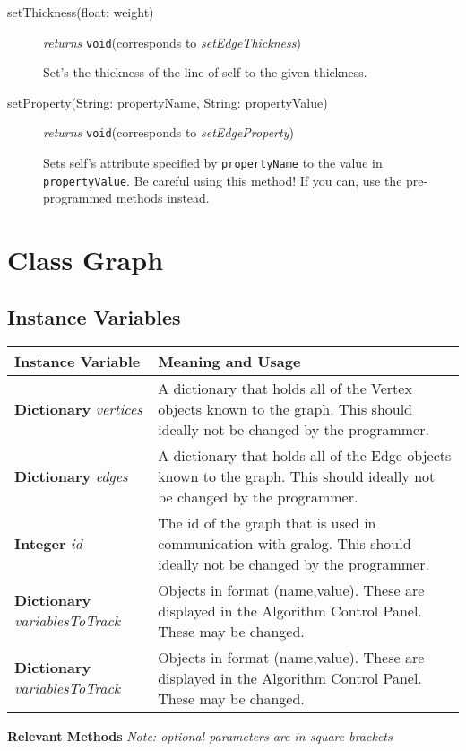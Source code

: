 \documentclass{article}
\newlength\q
\begin{document}
\begin{description}
\label{setEdgeThiccnessClass}\item[setThickness({float: weight})]\emph{returns} \texttt{void}\quad(corresponds to \textit{setEdgeThickness})

Set's the thickness of the line of self to the given thickness.

\label{setEdgePropertyClass}\item[setProperty(String: propertyName, String: propertyValue)] \emph{returns} \texttt{void}\quad(corresponds to \textit{setEdgeProperty})

Sets self's attribute specified by \texttt{propertyName} to the value in \texttt{propertyValue}. Be careful using this method! If you can, use the pre-programmed methods instead.
\end{description}
\section{Class Graph}

\subsection{Instance Variables}


\begin{longtable}{p{\q}p{\q}}
Instance Variable & Meaning and Usage \\ \hline
\textbf{Dictionary} \textit{vertices} & A dictionary that holds all of the Vertex objects known to the graph. This should ideally not be changed by the programmer. \\\hline
\textbf{Dictionary} \textit{edges} & A dictionary that holds all of the Edge objects known to the graph. This should ideally not be changed by the programmer. \\\hline
\textbf{Integer} \textit{id} & The id of the graph that is used in communication with gralog. This should ideally not be changed by the programmer. \\ \hline
\textbf{Dictionary} \textit{variablesToTrack} & Objects in format (name,value). These are displayed in the Algorithm Control Panel. These may be changed. \\ \hline
\textbf{Dictionary} \textit{variablesToTrack} & Objects in format (name,value). These are displayed in the Algorithm Control Panel. These may be changed. \\ \hline
\end{longtable}


\textbf{{\large Relevant Methods}}
\textit{Note: optional parameters are in square brackets}
\end{document}
